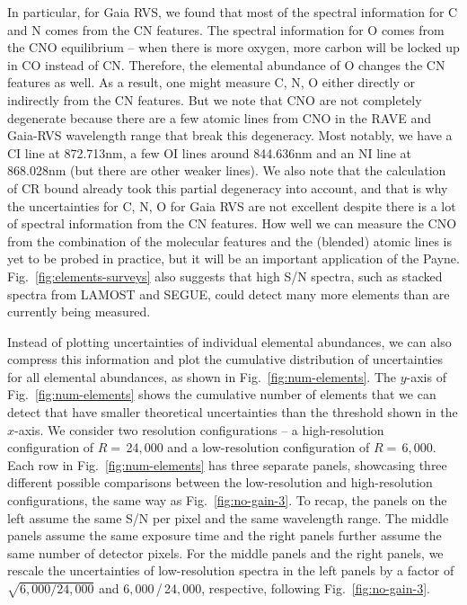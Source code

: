 \documentclass[iop]{emulateapj}
\begin{document}
\begin{CJK*}{UTF8}{gbsn}
In particular, for Gaia RVS, we found that most of the spectral information for C and N comes from the CN features. The spectral information for O comes from the CNO equilibrium -- when there is more oxygen, more carbon will be locked up in CO instead of CN. Therefore, the elemental abundance of O changes the CN features as well. As a result, one might measure C, N, O either directly or indirectly from the CN features. But we note that CNO are not completely degenerate because there are a few atomic lines from CNO in the RAVE and Gaia-RVS wavelength range that break this degeneracy. Most notably, we have a CI line at 872.713nm, a few OI lines around 844.636nm and an NI line at 868.028nm (but there are other weaker lines). We also note that the calculation of CR bound already took this partial degeneracy into account, and that is why the uncertainties for C, N, O for Gaia RVS are not excellent despite there is a lot of spectral information from the CN features. How well we can measure the CNO from the combination of the molecular features and the (blended) atomic lines is yet to be probed in practice, but it will be an important application of the Payne. Fig.~\ref{fig:elements-surveys} also suggests that high S/N spectra, such as stacked spectra from LAMOST and SEGUE, could detect many more elements than are currently being measured.

Instead of plotting uncertainties of individual elemental abundances, we can also compress this information and plot the cumulative distribution of uncertainties for all elemental abundances, as shown in Fig.~\ref{fig:num-elements}. The $y$-axis of Fig.~\ref{fig:num-elements} shows the cumulative number of elements that we can detect that have smaller theoretical uncertainties than the threshold shown in the $x$-axis. We consider two resolution configurations -- a high-resolution configuration of $R = \,$24$,$000 and a low-resolution configuration of $R = \,$6$,$000. Each row in Fig.~\ref{fig:num-elements} has three separate panels, showcasing three different possible comparisons between the low-resolution and high-resolution configurations, the same way as Fig.~\ref{fig:no-gain-3}. To recap, the panels on the left assume the same S/N per pixel and the same wavelength range. The middle panels assume the same exposure time and the right panels further assume the same number of detector pixels. For the middle panels and the right panels, we rescale the uncertainties of low-resolution spectra in the left panels by a factor of $\sqrt{6,000/24,000}$ and 6$,$000$\,$/$\,$24$,$000, respective, following Fig.~\ref{fig:no-gain-3}.


\end{CJK*}
\end{document}
